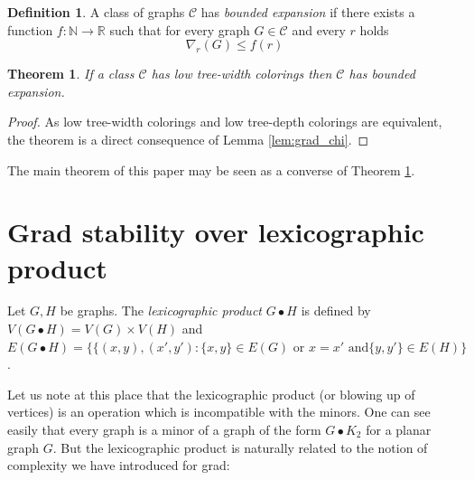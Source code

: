 \documentclass[a4paper]{amsart}
\newtheorem{theorem}{Theorem}[section]
\theoremstyle{definition}
\newtheorem{definition}{Definition}[section]
\theoremstyle{remark}
\newcommand{\field}[1]{\mathbb{#1}}
\newcommand{\bbbn}{\field{N}}
\newcommand{\bbbr}{\field{R}}
\newcommand{\rdens}[1]{\nabla_{#1}}
\begin{document}
\begin{definition}
A class of graphs $\mathcal C$ has {\em bounded expansion} if there
exists a function $f:\bbbn\rightarrow\bbbr$ such that for every graph $G \in \mathcal C$ and every $r$ holds
\begin{equation}
 \rdens{r}(G)\leq f(r)
\end{equation}
\end{definition}

\begin{theorem}
\label{th:tw2be}
If a class $\mathcal C$ has low tree-width colorings then
$\mathcal C$ has bounded expansion.
\end{theorem}
\begin{proof}
As low tree-width colorings and low tree-depth colorings are
equivalent, the theorem is a direct consequence of Lemma \ref{lem:grad_chi}.
\end{proof}

The main theorem of this paper may be seen as a converse of Theorem \ref{th:tw2be}.

\section{Grad stability over lexicographic product}
\label{sec:lex}
Let $G,H$ be graphs. The {\em lexicographic product} $G\bullet H$ is
defined by $V(G\bullet H)=V(G)\times V(H)$ and $E(G\bullet
H)=\{\{(x,y),(x',y'): \{x,y\}\in E(G)\text{ or }x=x'\text{ and
}\{y,y'\}\in E(H)\}$.

Let us note at this place that the lexicographic product 
(or blowing up of vertices) is an operation which is incompatible 
with the minors.  One can see easily that every graph is a minor of a 
graph of the form $G\bullet K_2$ for a planar graph $G$.
But the lexicographic product is naturally related to the notion of
complexity we have introduced for grad:
\end{document}
